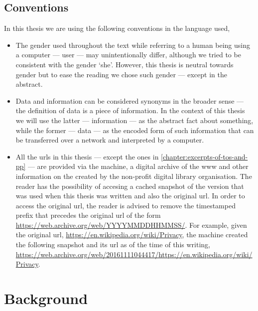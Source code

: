 \documentclass[showtrims,oldfontcommands]{kthesis}
\begin{document}
\section{Conventions}
    \label{section:conventions}
In this thesis we are using the following conventions in the language used,
\begin{itemize}
    \item The gender used throughout the text while referring to a human being using 
    a computer --- user --- may unintentionally differ, although we tried to be 
    consistent with the gender `she'. However, this thesis is neutral towards gender 
    but to ease the reading we chose such gender --- except in the abstract.

    \item Data and information can be considered synonyms in the broader sense --- 
    the definition of data is a piece of information. In the context of this thesis 
    we will use the latter --- information --- as the abstract fact about something, 
    while the former --- data --- as the encoded form of such information that can 
    be transferred over a network and interpreted by a computer.
    
    \item All the \acp{url} in this thesis --- except the ones in \cref{chapter:excerpts-of-tos-and-pp} ---
    are provided via the \Wayback machine, a digital archive of the \ac{www} and 
    other information on the \Internet created by the \InternetArchive non-profit 
    digital library organisation. The reader has the possibility of accesing a cached 
    snapshot of the version that was used when this thesis was written and also 
    the original \ac{url}. In order to access the original \ac{url}, the reader 
    is advised to remove the timestamped prefix that precedes the original \ac{url} 
    of the form \url{https://web.archive.org/web/YYYYMMDDHHMMSS/}. For example, 
    given the original \ac{url}, \url{https://en.wikipedia.org/wiki/Privacy}, the 
    \Wayback machine created the following snapshot and its \ac{url} as of the time 
    of this writing, \url{https://web.archive.org/web/20161111044417/https://en.wikipedia.org/wiki/Privacy}.
\end{itemize}


\chapter{Background}
    \label{chapter:background}
\end{document}
